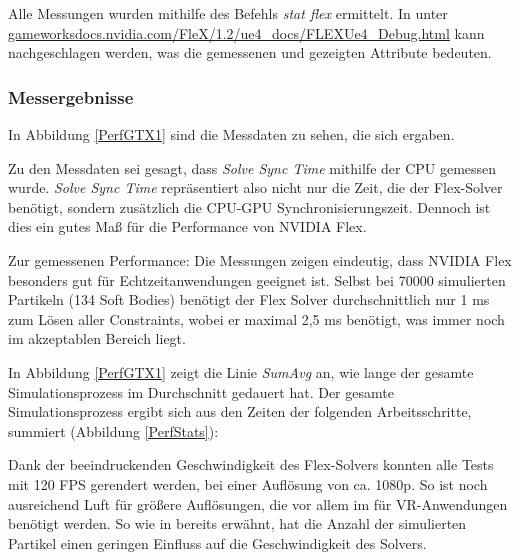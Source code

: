 Alle Messungen wurden mithilfe des Befehls \textit{stat flex} ermittelt. In \cite{UE4FlexDoc} unter \url{gameworksdocs.nvidia.com/FleX/1.2/ue4_docs/FLEXUe4_Debug.html} kann nachgeschlagen werden, was die gemessenen und gezeigten Attribute bedeuten.

\subsubsection{Messergebnisse}


In Abbildung \ref{PerfGTX1} sind die Messdaten zu sehen, die sich ergaben.


Zu den Messdaten sei gesagt, dass \textit{Solve Sync Time} mithilfe der CPU gemessen wurde. \textit{Solve Sync Time} repräsentiert also nicht nur die Zeit, die der Flex-Solver benötigt, sondern zusätzlich die CPU-GPU Synchronisierungszeit. Dennoch ist dies ein gutes Maß für die Performance von NVIDIA Flex. 

Zur gemessenen Performance: 
Die Messungen zeigen eindeutig, dass NVIDIA Flex besonders gut für Echtzeitanwendungen geeignet ist. Selbst bei 70000 simulierten Partikeln (134 Soft Bodies) benötigt der Flex Solver durchschnittlich nur 1 ms zum Lösen aller Constraints, wobei er maximal 2,5 ms benötigt, was immer noch im akzeptablen Bereich liegt. 

In Abbildung \ref{PerfGTX1} zeigt die Linie \textit{SumAvg} an, wie lange der gesamte Simulationsprozess im Durchschnitt gedauert hat. Der gesamte Simulationsprozess ergibt sich aus den Zeiten der folgenden Arbeitsschritte, summiert (Abbildung \ref{PerfStats}):


Dank der beeindruckenden Geschwindigkeit des Flex-Solvers konnten alle Tests mit 120 \ac{FPS} gerendert werden, bei einer Auflösung von ca. 1080p. So ist noch ausreichend Luft für größere Auflösungen, die vor allem im für VR-Anwendungen benötigt werden. So wie in \cite{FlexD3D} bereits erwähnt, hat die Anzahl der simulierten Partikel einen geringen Einfluss auf die Geschwindigkeit des Solvers.


